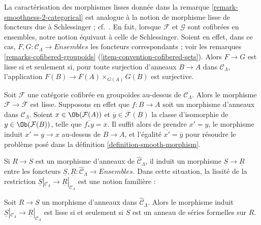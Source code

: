 \begin{remark}
\label{remark-compare-smooth-schlessinger}
La caractérisation des morphismes lisses donnée dans la remarque
\ref{remark-smoothness-2-categorical} est analogue à la notion de morphisme
lisse de foncteurs due à Schlessinger ; cf.\ \cite[définition 2.2.]{Sch}. En
fait, lorsque $\mathcal{F}$ et $\mathcal{G}$ sont cofibrées en ensembles,
notre notion équivaut à celle de Schlessinger. Soient en effet, dans ce cas,
$F, G : \mathcal{C}_\Lambda \to \textit{Ensembles}$ les foncteurs correspondants ;
voir les remarques \ref{remarks-cofibered-groupoids}
(\ref{item-convention-cofibered-sets}).
Alors $F \to G$ est lisse si et seulement si, pour toute surjection d'anneaux
$B \to A$ dans $\mathcal{C}_\Lambda$, l'application
$F(B) \to F(A) \times_{G(A)} G(B)$ est surjective.
\end{remark}

\begin{remark}
\label{remark-smooth-to-iso-classes}
Soit $\mathcal{F}$ une catégorie cofibrée en groupoïdes au-dessus de
$\mathcal{C}_\Lambda$. Alors le morphisme
$\mathcal{F} \to \overline{\mathcal{F}}$ est lisse. Supposons en effet que
$f : B \to A$ soit un morphisme d'anneaux dans $\mathcal{C}_\Lambda$. Soient
$x \in \Ob(\mathcal{F}(A))$ et
$\overline{y} \in \overline{\mathcal{F}}(B)$
la classe d'isomorphie de $y \in \Ob(\mathcal{F}(B))$, telle que
$\overline{f_*y} = \overline{x}$. Il suffit alors de prendre $x' = y$, le
morphisme induit $x' = y \to x$ au-dessus de $B \to A$, et l'égalité
$\overline{x'} = \overline{y}$ pour résoudre le problème posé dans la
définition \ref{definition-smooth-morphism}.
\end{remark}

\noindent
Si $R \to S$ est un morphisme d'anneaux de
$\widehat{\mathcal{C}}_\Lambda$, il induit un morphisme
$\underline{S} \to \underline{R}$ entre les foncteurs
$\underline{S}, \underline{R}: \widehat{\mathcal{C}}_\Lambda
\to \textit{Ensembles}$. Dans cette situation, la lissité de la restriction
$\underline{S}|_{\mathcal{C}_\Lambda} \to
\underline{R}|_{\mathcal{C}_\Lambda}$ est une notion familière :

\begin{lemma}
\label{lemma-smooth-morphism-power-series}
Soit $R \to S$ un morphisme d'anneaux dans
$\widehat{\mathcal{C}}_\Lambda$. Alors le morphisme induit
$\underline{S}|_{\mathcal{C}_\Lambda} \to \underline{R}|_{\mathcal{C}_\Lambda}$
est lisse si et seulement si $S$ est un anneau de séries formelles sur $R$.
\end{lemma}

